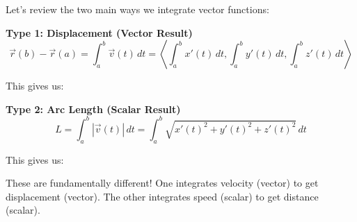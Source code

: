 \documentclass{ximera}
\begin{document}
\begin{problem}
Let's review the two main ways we integrate vector functions:

\textbf{Type 1: Displacement (Vector Result)}
$$\vec{r}(b)-\vec{r}(a)= \int_a^b \vec{v}(t)\, dt=\left\langle \int_a^b x'(t)\, dt, \int_a^b y'(t)\, dt, \int_a^b z'(t)\, dt\right\rangle$$

This gives us:
\begin{multipleChoice}
\end{multipleChoice}

\textbf{Type 2: Arc Length (Scalar Result)}
$$L = \int_a^b |\vec{v}(t)|\, dt=\int_a^b\sqrt{x'(t)^2+y'(t)^2+z'(t)^2}\, dt$$

This gives us:
\begin{multipleChoice}
\end{multipleChoice}

\begin{feedback}
These are fundamentally different! One integrates velocity (vector) to get displacement (vector). The other integrates speed (scalar) to get distance (scalar).
\end{feedback}
\end{problem}
\end{document}
